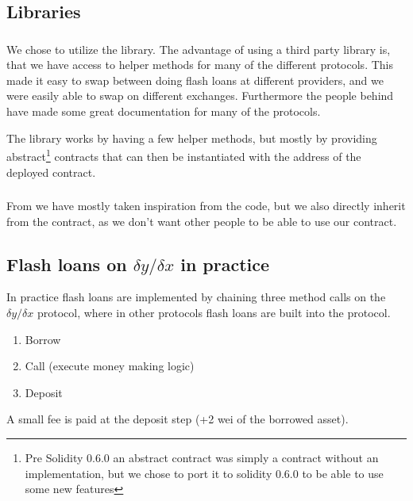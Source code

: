 \subsection{Libraries}
\subsubsection{}
We chose to utilize the  library. The advantage of using a
third party library is, that we have access to helper methods for many of the
different protocols. This made it easy to swap between doing flash loans at
different providers, and we were easily able to swap on different exchanges.
Furthermore the people behind  have made some great
documentation for many of the protocols.

The  library works by having a few helper methods, but mostly
by providing abstract\footnote{Pre Solidity 0.6.0 an abstract contract was
simply a contract without an implementation, but we chose to port it to solidity
0.6.0 to be able to use some new features} contracts that can then be
instantiated with the address of the deployed contract.

\subsubsection{}

From  we have mostly taken inspiration from the code, but we
also directly inherit from the  contract, as we don't want other
people to be able to use our contract.

\subsection{Flash loans on $\delta y/\delta x$ in practice}
In practice flash loans are implemented by chaining three method calls on the
$\delta y/\delta x$ protocol, where in other protocols flash loans are built
into the protocol.
\begin{enumerate}
    \item Borrow
    \item Call (execute money making logic)
    \item Deposit
\end{enumerate}
A small fee is paid at the deposit step (+2 wei of the borrowed asset).

